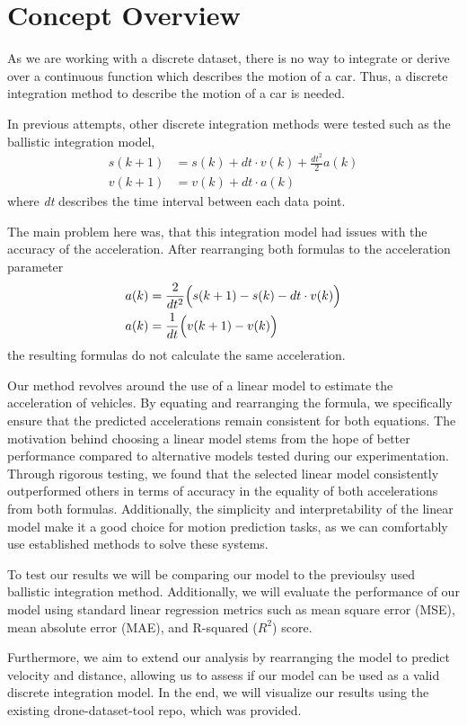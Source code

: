 \section{Concept Overview}
As we are working with a discrete dataset, there is no way to integrate or derive over a continuous function which describes the motion of a car. 
Thus, a discrete integration method to describe the motion of a car is needed. 

In previous attempts, other discrete integration methods were tested such as the ballistic integration model, 
\begin{align}
s(k+1) &= s(k) + dt \cdot v(k) + \frac{dt^2}{2} a(k) \\
v(k+1) &= v(k) + dt \cdot                       a(k)
\end{align}
where \textit{dt} describes the time interval between each data point.

The main problem here was, that this integration model had issues with the accuracy of the acceleration. 
After rearranging both formulas to the acceleration parameter 
\begin{align}
    a(k) &= \frac{2}{dt^2} \Bigl( s(k+1) - s(k) - dt \cdot v(k) \Bigr)\\
    a(k) &= \frac{1}{dt} \Bigl( v(k+1) - v(k) \Bigr)
\end{align}
the resulting formulas do not calculate the same acceleration. 

Our method revolves around the use of a linear model to estimate the acceleration of vehicles.
By equating and rearranging the formula, we specifically ensure that the predicted accelerations remain consistent
for both equations.
The motivation behind choosing a linear model stems from the hope of better performance compared 
to alternative models tested during our experimentation. 
Through rigorous testing, we found that the selected linear model consistently outperformed others in 
terms of accuracy in the equality of both accelerations from both formulas.
Additionally, the simplicity and interpretability of the linear model make it a good choice for 
motion prediction tasks, as we can comfortably use established methods to solve these systems. 


To test our results we will be comparing our model to the previoulsy used ballistic integration method.
Additionally, we will evaluate the performance of our model using standard linear regression metrics such as 
mean square error (MSE), mean absolute error (MAE), and R-squared ($R^2$) score.

Furthermore, we aim to extend our analysis by rearranging the model to predict velocity and distance, 
allowing us to assess if our model can be used as a valid discrete integration model.
In the end, we will visualize our results using the existing drone-dataset-tool repo, which was provided.


